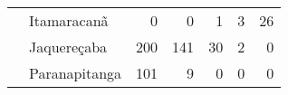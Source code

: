 \begin{table}[ht]
\begin{tabular}{ll rrrrr}
                          & Itamaracanã             &                  0 &            0 &           1 &          3 &               26 \\ 
                          & Jaquereçaba             &                200 &          141 &          30 &          2 &                0 \\ 
                          & Paranapitanga           &                101 &            9 &           0 &          0 &                0 \\ 
   \bottomrule
\end{tabular}
\end{table}

